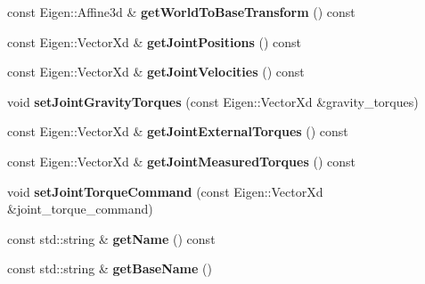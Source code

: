 \begin{DoxyCompactItemize}
const Eigen\+::\+Affine3d \& {\bfseries get\+World\+To\+Base\+Transform} () const
\item 
\mbox{\label{classgazebo_1_1_panda_simulation_a77e7229b268b3c017a3978b665590cf5}} 
const Eigen\+::\+Vector\+Xd \& {\bfseries get\+Joint\+Positions} () const
\item 
\mbox{\label{classgazebo_1_1_panda_simulation_aa2c2a0942fb5c92963f5346ca43c41db}} 
const Eigen\+::\+Vector\+Xd \& {\bfseries get\+Joint\+Velocities} () const
\item 
\mbox{\label{classgazebo_1_1_panda_simulation_a0894b02fce85f67fc738d6b39f003ffb}} 
void {\bfseries set\+Joint\+Gravity\+Torques} (const Eigen\+::\+Vector\+Xd \&gravity\+\_\+torques)
\item 
\mbox{\label{classgazebo_1_1_panda_simulation_afd74aa25a079896d404a7988179535d8}} 
const Eigen\+::\+Vector\+Xd \& {\bfseries get\+Joint\+External\+Torques} () const
\item 
\mbox{\label{classgazebo_1_1_panda_simulation_ad122946ad9e69b5932855f15df6a3b9c}} 
const Eigen\+::\+Vector\+Xd \& {\bfseries get\+Joint\+Measured\+Torques} () const
\item 
\mbox{\label{classgazebo_1_1_panda_simulation_a562e9bbacd575381fe7582dcd6dd4d8b}} 
void {\bfseries set\+Joint\+Torque\+Command} (const Eigen\+::\+Vector\+Xd \&joint\+\_\+torque\+\_\+command)
\item 
\mbox{\label{classgazebo_1_1_panda_simulation_a6b1958c7de3707dc3984e0ba70f34d2e}} 
const std\+::string \& {\bfseries get\+Name} () const
\item 
\mbox{\label{classgazebo_1_1_panda_simulation_ab1fde66312c68f0f626c65846b9a5897}} 
const std\+::string \& {\bfseries get\+Base\+Name} ()
\item 
\mbox{\label{classgazebo_1_1_panda_simulation_ae7379a3f13baabc530055ba8140d82b3}} 

\end{DoxyCompactItemize}
